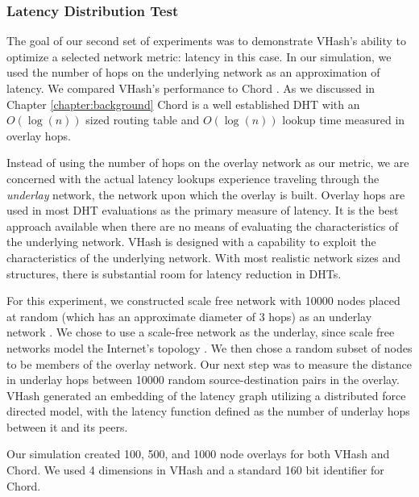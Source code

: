\subsubsection{Latency Distribution Test}
The goal of our second set of experiments was to demonstrate VHash's ability to optimize a selected network metric: latency in this case. 
In our simulation, we used the number of hops on the underlying network as an approximation of latency.
We compared VHash's performance to Chord \cite{chord}.
As we discussed in Chapter \ref{chapter:background} Chord is a well established DHT with an $O(\log(n))$ sized routing table and $O(\log(n))$ lookup time measured in overlay hops.  

Instead of using the number of hops on the overlay network as our metric, we are concerned with the actual latency lookups experience traveling through the \emph{underlay} network, the network upon which the overlay is built.
Overlay hops are used in most DHT evaluations as the primary measure of latency.
It is the best approach available when there are no means of evaluating the characteristics of the underlying network.
VHash is designed with a capability to exploit the characteristics of the underlying network.
With most realistic network sizes and structures, there is substantial room for latency reduction in DHTs.

For this experiment, we constructed scale free network with 10000 nodes placed at random (which has an approximate diameter of 3 hops) as an underlay network \cite{cohen2000resilience} \cite{pastor2001epidemic} \cite{hagberg2004}.
We chose to use a scale-free network as the underlay, since  scale free networks model the Internet's topology \cite{cohen2000resilience} \cite{pastor2001epidemic}.
We then chose a random subset of nodes to be members of the overlay network.
Our next step was to measure the distance in underlay hops between 10000 random source-destination pairs in the overlay. 
VHash generated an embedding of the latency graph utilizing a distributed force directed model, with the latency function defined as the number of underlay hops between it and its peers.

Our simulation created 100, 500, and 1000 node overlays for both VHash and Chord.
We used 4 dimensions in VHash and a standard 160 bit identifier for Chord.




